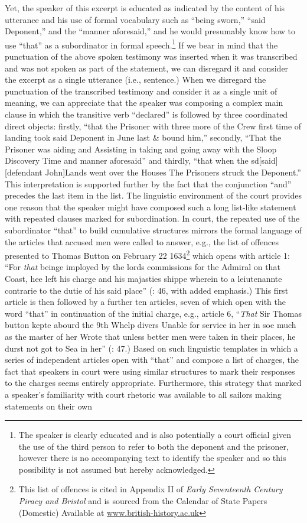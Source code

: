 Yet, the speaker of this excerpt is educated as indicated by the content of his utterance and his use of formal vocabulary such as “being sworn,” “said Deponent,” and the “manner aforesaid,” and he would presumably know how to use “that” as a subordinator in formal speech.\footnote{The speaker is clearly educated and is also potentially a court official given the use of the third person to refer to both the deponent and the prisoner, however there is no accompanying text to identify the speaker and so this possibility is not assumed but hereby acknowledged.} If we bear in mind that the punctuation of the above spoken testimony was inserted when it was transcribed and was not spoken as part of the statement, we can disregard it and consider the excerpt as a single utterance (i.e., sentence.) When we disregard the punctuation of the transcribed testimony and consider it as a single unit of meaning, we can appreciate that the speaker was composing a complex main clause in which the transitive verb “declared” is followed by three coordinated direct objects: firstly, “that the Prisoner with three more of the Crew first time of landing took said Deponent in June last \& bound him,” secondly, “That the Prisoner was aiding and Assisting in taking and going away with the Sloop Discovery Time and manner aforesaid” and thirdly, “that when the sd[said] [defendant John]Lands went over the Houses The Prisoners struck the Deponent.” This interpretation is supported further by the fact that the conjunction “and” precedes the last item in the list. The linguistic environment of the court provides one reason that the speaker might have composed such a long list-like statement with repeated clauses marked for subordination. In court, the repeated use of the subordinator “that” to build cumulative structures mirrors the formal language of the articles that accused men were called to answer, e.g., the list of offences presented to Thomas Button on February 22 1634\footnote{This list of offences is cited in Appendix II of \textit{Early Seventeenth Century Piracy and Bristol} \citep[46-48]{Hill2013} and is sourced from the Calendar of State Papers (Domestic) Available at \href{http://www.british-history.ac.uk}{www.british-history.ac.uk}} which opens with article 1: “For \textit{that} beinge imployed by the lords commissions for the Admiral on that Coast, hee left his charge and his majasties shippe wherein to a leiutenannte contrarie to the dutie of his said place” (\citealt{Hill2013}: 46, with added emphasis.) This first article is then followed by a further ten articles, seven of which open with the word “that” in continuation of the initial charge, e.g., article 6, “\textit{That} Sir Thomas button kepte abourd the 9th Whelp divers Unable for service in her in soe much as the master of her Wrote that unless better men were taken in their places, he durst not got to Sea in her” (\citealt{Hill2013}: 47.) Based on such linguistic templates in which a series of independent articles open with “that” and compose a list of charges, the fact that speakers in court were using similar structures to mark their responses to the charges seems entirely appropriate. Furthermore, this strategy that marked a speaker’s familiarity with court rhetoric was available to all sailors making statements on their own 